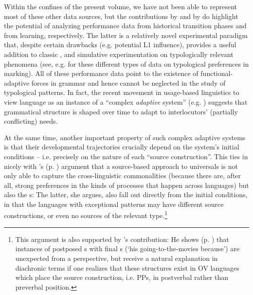 \documentclass[output=paper]{langsci/langscibook}
\begin{document}
Within the confines of the present volume, we have not been able to represent most of these other data sources, but the contributions by  and by  do highlight the potential of analyzing performance data from historical transition phases and from  learning, respectively. The latter is a relatively novel experimental paradigm that, despite certain drawbacks (e.g. potential L1 influence), provides a useful addition to classic ,  and simulative experimentation on typologically relevant phenomena (see, e.g. \citealt{KurumadaJaeger2015,BickelEtAl2015,Lestrade2018} for these different types of data on typological preferences in  marking). All of these performance data point to the existence of functional-adaptive forces in grammar and hence cannot be neglected in the study of typological patterns. In fact, the recent movement in usage-based linguistics to view language as an instance of a “complex \textit{adaptive} system” (e.g. \citealt{Gell-Mann1992,BecknerEtAl2009}) suggests that grammatical structure is shaped over time to adapt to interlocutors’ (partially conflicting) needs. 

\newpage 
At the same time, another important property of such complex adaptive systems is that their developmental trajectories crucially depend on the system’s initial conditions – i.e. precisely on the nature of each “source construction”. This ties in nicely with ’s (p. \pageref{p:cristofaro:commonalitiesexceptions}) argument that a source-based approach to universals is not only able to capture the cross-linguistic commonalities (because there are, after all, strong preferences in the kinds of  processes that happen across languages) but also the s: The latter, she argues, also fall out directly from the initial conditions, in that the languages with exceptional patterns may have different source constructions, or even no sources of the relevant type.\footnote{This argument is also supported by ’s contribution: He shows (p. \pageref{p:diessel:exception}) that instances of postposed s with final s (‘his going-to-the-movies because’) are unexpected from a  perspective, but receive a natural explanation in diachronic terms if one realizes that these structures exist in OV languages which place the source construction, i.e.  PPs, in postverbal rather than preverbal position.}  
\end{document}
